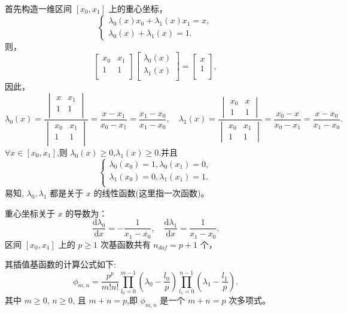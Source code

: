 \documentclass{article}
\begin{document}
首先构造一维区间 $[x_0,x_1]$ 上的重心坐标，
$$
\begin{cases}
\lambda _0(x)x_0+\lambda _1(x)x_1=x,\\
\lambda _0(x)+\lambda _1(x)=1.
\end{cases}
$$
则，
$$
\begin{bmatrix}
x_0 & x_1\\
1 & 1\\
\end{bmatrix}
\begin{bmatrix}
\lambda _0(x)\\
\lambda _1(x)\\
\end{bmatrix}=\begin{bmatrix}
x\\
1\\
\end{bmatrix},
$$
因此，
$$
\lambda _0(x)=\frac{\begin{vmatrix}
x & x_1 \\
1 & 1 \\
\end{vmatrix}}{\begin{vmatrix}
x_0 & x_1 \\
1 & 1 \\
\end{vmatrix}}=\frac{x-x_1}{x_0-x_1}=\frac{x_1-x_0}{x_1-x_0},
\quad\lambda _1(x)=\frac{\begin{vmatrix}
x_0 & x \\
1 & 1
\end{vmatrix}}{\begin{vmatrix}
x_0 & x_1 \\
1 & 1
\end{vmatrix}}=\frac{x_0-x}{x_0-x_1}=\frac{x-x_0}{x_1-x_0}.
$$
$\forall x\in [x_0,x_1]$,则 $\lambda _0(x)\ge 0$,$\lambda _1(x)\ge 0$.并且
$$
\begin{cases}
\lambda _0 (x_0)=1,\lambda _0 (x_1)=0,\\
\lambda _1 (x_0)=0,\lambda _1 (x_1)=1.\\
\end{cases}
$$
易知, $\lambda_0, \lambda_1$ 都是关于 $x$ 的线性函数(这里指一次函数)。

重心坐标关于 $x$ 的导数为：
$$
\frac{\mathrm d \lambda_0}{\mathrm dx} = -\frac{1}{x_1 - x_0},\quad 
\frac{\mathrm d \lambda_1}{\mathrm dx} = \frac{1}{x_1 - x_0}.
$$
区间 $[x_0, x_1]$ 上的 $p\geq 1$ 次基函数共有 
$n_{dof} = p+1$ 个，

其插值基函数的计算公式如下:
$$
\phi_{m,n} = \frac{p^p}{m!n!}\prod_{l_0 = 0}^{m - 1}
(\lambda_0 - \frac{l_0}{p}) \prod_{l_1 = 0}^{n-1}(\lambda_1 -
\frac{l_1}{p}).
$$
其中 $m\geq 0$, $n\geq 0$, 且 $m+n=p$,即 $\phi_{m,n}$ 是一个 $m+n=p$ 次多项式。
\end{document}
